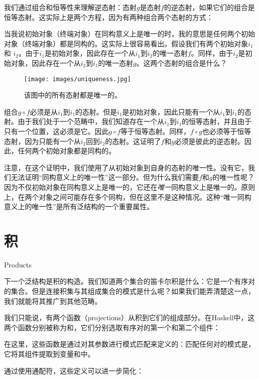 我们通过组合和恒等性来理解逆态射：态射$g$是态射$f$的逆态射，如果它们的组合是恒等态射。这实际上是两个方程，因为有两种组合两个态射的方式：

当我说初始对象（终端对象）在同构意义上是唯一的时，我的意思是任何两个初始对象（终端对象）都是同构的。这实际上很容易看出。假设我们有两个初始对象$i_{1}$ 和 $i_{2}$。由于$i_{1}$是初始对象，因此存在一个从$i_{1}$到$i_{2}$的唯一态射$f$。同样，由于$i_{2}$是初始对象，因此存在一个从$i_{2}$到$i_{1}$的唯一态射$g$。这两个态射的组合是什么？

\begin{figure}[H]
  \centering
  \texttt{[image: images/uniqueness.jpg]}
  \caption{该图中的所有态射都是唯一的。}
\end{figure}

\noindent
组合$g \circ f$必须是从$i_{1}$到$i_{1}$的态射。但是$i_{1}$是初始对象，因此只能有一个从$i_{1}$到$i_{1}$的态射。由于我们处于一个范畴中，我们知道存在一个从$i_{1}$到$i_{1}$的恒等态射，并且由于只有一个位置，这必须是它。因此$g \circ f$等于恒等态射。同样，$f \circ g$也必须等于恒等态射，因为只能有一个从$i_{2}$回到$i_{2}$的态射。这证明了$f$和$g$必须是彼此的逆态射。因此，任何两个初始对象都是同构的。

注意，在这个证明中，我们使用了从初始对象到自身的态射的唯一性。没有它，我们无法证明“同构意义上的唯一性”这一部分。但为什么我们需要$f$和$g$的唯一性呢？因为不仅初始对象在同构意义上是唯一的，它还在\emph{唯一}同构意义上是唯一的。原则上，在两个对象之间可能存在多个同构，但在这里不是这种情况。这种“唯一同构意义上的唯一性”是所有泛结构的一个重要属性。

\section{积}{Products}

下一个泛结构是积的构造。我们知道两个集合的笛卡尔积是什么：它是一个有序对的集合。但是连接积集与其组成集合的模式是什么呢？如果我们能弄清楚这一点，我们就能将其推广到其他范畴。

我们只能说，有两个函数（projections）从积到它们的组成部分。在Haskell中，这两个函数分别被称为和，它们分别选取有序对的第一个和第二个组件：


在这里，这些函数是通过对其参数进行模式匹配来定义的：匹配任何对的模式是，它将其组件提取到变量和中。

通过使用通配符，这些定义可以进一步简化：

